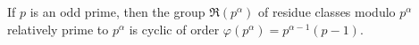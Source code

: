 If $p$ is an odd prime, then the group $\mathfrak{R}(p^\alpha)$ of residue classes modulo $p^\alpha$ relatively prime to $p^\alpha$ is cyclic of order $\varphi(p^\alpha) = p^{\alpha-1}(p-1)$.
